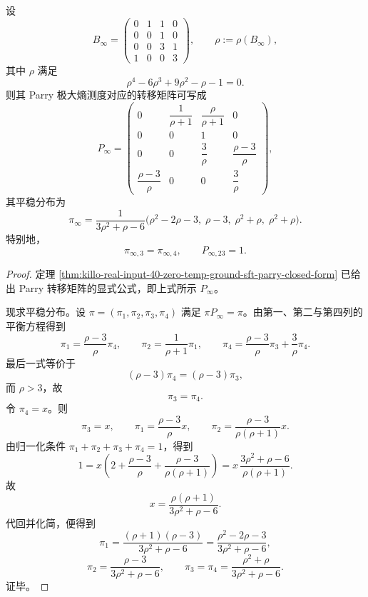 \begin{theorem}\label{thm:conclusion-realinput40-zero-temp-parry-chain-explicit}
设
\[
B_\infty=
\begin{pmatrix}
0&1&1&0\\
0&0&1&0\\
0&0&3&1\\
1&0&0&3
\end{pmatrix},
\qquad
\rho:=\rho(B_\infty),
\]
其中 \(\rho\) 满足
\[
\rho^4-6\rho^3+9\rho^2-\rho-1=0.
\]
则其 Parry 极大熵测度对应的转移矩阵可写成
\[
P_\infty=
\begin{pmatrix}
0 & \dfrac{1}{\rho+1} & \dfrac{\rho}{\rho+1} & 0\\[4pt]
0 & 0 & 1 & 0\\[4pt]
0 & 0 & \dfrac{3}{\rho} & \dfrac{\rho-3}{\rho}\\[4pt]
\dfrac{\rho-3}{\rho} & 0 & 0 & \dfrac{3}{\rho}
\end{pmatrix},
\]
其平稳分布为
\[
\pi_\infty
=
\frac{1}{3\rho^2+\rho-6}
\bigl(
\rho^2-2\rho-3,\;
\rho-3,\;
\rho^2+\rho,\;
\rho^2+\rho
\bigr).
\]
特别地，
\[
\pi_{\infty,3}=\pi_{\infty,4},
\qquad
P_{\infty,23}=1.
\]
\end{theorem}
\begin{proof}
定理 \ref{thm:killo-real-input-40-zero-temp-ground-sft-parry-closed-form} 已给出 Parry 转移矩阵的显式公式，即上式所示 \(P_\infty\)。

现求平稳分布。设 \(\pi=(\pi_1,\pi_2,\pi_3,\pi_4)\) 满足 \(\pi P_\infty=\pi\)。由第一、第二与第四列的平衡方程得到
\[
\pi_1=\frac{\rho-3}{\rho}\pi_4,
\qquad
\pi_2=\frac{1}{\rho+1}\pi_1,
\qquad
\pi_4=\frac{\rho-3}{\rho}\pi_3+\frac{3}{\rho}\pi_4.
\]
最后一式等价于
\[
(\rho-3)\pi_4=(\rho-3)\pi_3,
\]
而 \(\rho>3\)，故
\[
\pi_3=\pi_4.
\]
令 \(\pi_4=x\)。则
\[
\pi_3=x,
\qquad
\pi_1=\frac{\rho-3}{\rho}x,
\qquad
\pi_2=\frac{\rho-3}{\rho(\rho+1)}x.
\]
由归一化条件 \(\pi_1+\pi_2+\pi_3+\pi_4=1\)，得到
\[
1=x\left(
2+\frac{\rho-3}{\rho}+\frac{\rho-3}{\rho(\rho+1)}
\right)
=
x\,\frac{3\rho^2+\rho-6}{\rho(\rho+1)}.
\]
故
\[
x=\frac{\rho(\rho+1)}{3\rho^2+\rho-6}.
\]
代回并化简，便得到
\[
\pi_1=\frac{(\rho+1)(\rho-3)}{3\rho^2+\rho-6}
=
\frac{\rho^2-2\rho-3}{3\rho^2+\rho-6},
\]
\[
\pi_2=\frac{\rho-3}{3\rho^2+\rho-6},
\qquad
\pi_3=\pi_4=\frac{\rho^2+\rho}{3\rho^2+\rho-6}.
\]
证毕。
\end{proof}

